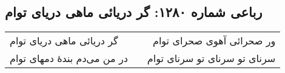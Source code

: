 \begin{center}
\section*{رباعی شماره ۱۲۸۰: گر دریائی ماهی دریای توام}
\label{sec:1280}
\begin{longtable}{l p{0.5cm} r}
گر دریائی ماهی دریای توام
&&
ور صحرائی آهوی صحرای توام
\\
در من می‌دم بندهٔ دمهای توام
&&
سرنای تو سرنای تو سرنای توام
\\
\end{longtable}
\end{center}
